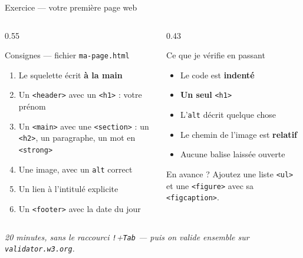 \documentclass[aspectratio=169,11pt]{beamer}
\begin{document}
\begin{frame}{Exercice --- votre première page web}
  \begin{columns}[T]
    \begin{column}{0.55\textwidth}
      \begin{block}{Consignes --- fichier \texttt{ma-page.html}}
        \begin{enumerate}
          \item Le squelette écrit \textbf{à la main}
          \item Un \texttt{<header>} avec un \texttt{<h1>} : votre prénom
          \item Un \texttt{<main>} avec une \texttt{<section>} : un \texttt{<h2>}, un paragraphe, un mot en \texttt{<strong>}
          \item Une image, avec un \texttt{alt} correct
          \item Un lien à l'intitulé explicite
          \item Un \texttt{<footer>} avec la date du jour
        \end{enumerate}
      \end{block}
    \end{column}
    \begin{column}{0.43\textwidth}
      \begin{alertblock}{Ce que je vérifie en passant}
        \begin{itemize}
          \item Le code est \textbf{indenté}
          \item \textbf{Un seul} \texttt{<h1>}
          \item L'\texttt{alt} décrit quelque chose
          \item Le chemin de l'image est \textbf{relatif}
          \item Aucune balise laissée ouverte
        \end{itemize}
      \end{alertblock}
      \vspace{0.1cm}
      \begin{exampleblock}{En avance ?}
        Ajoutez une liste \texttt{<ul>} et une \texttt{<figure>} avec sa \texttt{<figcaption>}.
      \end{exampleblock}
    \end{column}
  \end{columns}
  \vspace{0.1cm}
  \begin{center}
    \small\itshape 20 minutes, sans le raccourci \texttt{!}+\texttt{Tab} --- puis on valide ensemble sur \texttt{validator.w3.org}.
  \end{center}
\end{frame}
\end{document}
